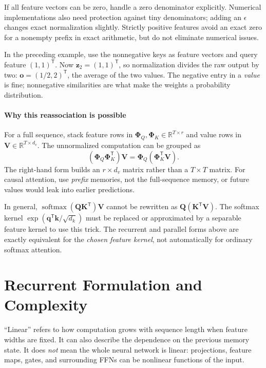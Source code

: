 \documentclass[11pt, oneside]{book}
\newcommand{\R}{\mathbb{R}}
\newcommand{\T}{^{\mathsf{T}}}           %
\DeclareMathOperator{\softmax}{softmax}
\let\originalsection\section
\renewcommand{\section}{\Needspace{7\baselineskip}\originalsection}
\begin{document}
If all feature vectors can be zero, handle a zero denominator explicitly. Numerical implementations also need protection against tiny denominators; adding an $\epsilon$ changes exact normalization slightly. Strictly positive features avoid an exact zero for a nonempty prefix in exact arithmetic, but do not eliminate numerical issues.

In the preceding example, use the nonnegative keys as feature vectors and query feature $(1,1)\T$. Now $\mathbf{z}_2=(1,1)\T$, so normalization divides the raw output by two: $\mathbf{o}=(1/2,2)\T$, the average of the two values. The negative entry in a \emph{value} is fine; nonnegative similarities are what make the weights a probability distribution.

\paragraph{Why this reassociation is possible} For a full sequence, stack feature rows in $\boldsymbol{\Phi}_Q,\boldsymbol{\Phi}_K\in\R^{T\times r}$ and value rows in $\mathbf{V}\in\R^{T\times d_v}$. The unnormalized computation can be grouped as
\[
 (\boldsymbol{\Phi}_Q\boldsymbol{\Phi}_K\T)\mathbf{V}
 =\boldsymbol{\Phi}_Q(\boldsymbol{\Phi}_K\T\mathbf{V}).
\]
The right-hand form builds an $r\times d_v$ matrix rather than a $T\times T$ matrix. For causal attention, use \emph{prefix} memories, not the full-sequence memory, or future values would leak into earlier predictions.

\begin{notebox}[title={You cannot move softmax through the matrix product}]
In general, $\softmax(\mathbf{Q}\mathbf{K}\T)\mathbf{V}$ cannot be rewritten as $\mathbf{Q}(\mathbf{K}\T\mathbf{V})$. The softmax kernel $\exp(\mathbf{q}\T\mathbf{k}/\sqrt{d_k})$ must be replaced or approximated by a separable feature kernel to use this trick. The recurrent and parallel forms above are exactly equivalent for the \emph{chosen feature kernel}, not automatically for ordinary softmax attention.
\end{notebox}

\section{Recurrent Formulation and Complexity}\label{sec:linear-recurrence}
``Linear'' refers to how computation grows with sequence length when feature widths are fixed. It can also describe the dependence on the previous memory state. It does \emph{not} mean the whole neural network is linear: projections, feature maps, gates, and surrounding FFNs can be nonlinear functions of the input.
\end{document}
